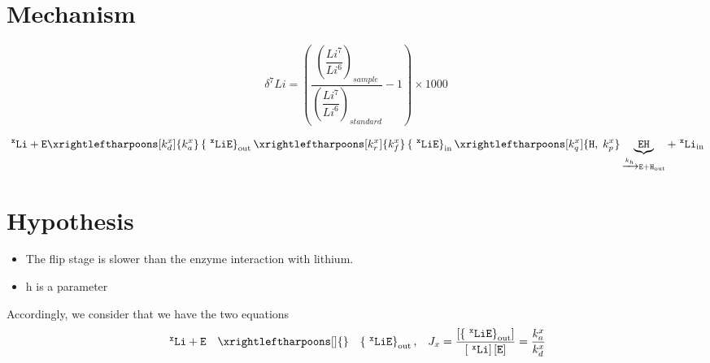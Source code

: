\documentclass[aps,onecolumn,11pt]{revtex4}
\newcommand{\mychem}[1]{\mathtt{#1}}
\newcommand{\myconc}[1]{\left\lbrack{#1}\right\rbrack}
\newcommand{\spLi}[1]{{~^{\mychem{#1}}\mychem{Li}}}
\newcommand{\Li}[1]{\myconc{\spLi{#1}}}
\newcommand{\spEout}{\mychem{E}}
\newcommand{\Eout}{\myconc{\spEout}}
\newcommand{\spLiEin}[1]{\left\lbrace\spLi{#1}\spEout\right\rbrace_{\mathrm{in}}}
\newcommand{\LiEin}[1]{\myconc{\spLiEin{#1}}}
\newcommand{\spLiEout}[1]{\left\lbrace\spLi{#1}\spEout\right\rbrace_{\mathrm{out}}}
\newcommand{\LiEout}[1]{\myconc{\spLiEout{#1}}}
\newcommand{\spLiIn}[1]{{\spLi{#1}}_{\mathrm{in}}}
\newcommand{\LiIn}[1]{\myconc{\spLiIn{#1}}}
\newcommand{\spEHin}{\mychem{EH}}
\newcommand{\EHin}{\myconc{\spEHin}}
\newcommand{\proton}{\mathrm{h}}
\begin{document}
\section{Mechanism}
$$
	\delta^7Li = \left(
		\dfrac{\left(\dfrac{Li^7}{Li^6}\right)_{sample}}
		{\left(\dfrac{Li^7}{Li^6}\right)_{standard}}
		 -1 
	\right) \times 1000
$$


\begin{equation}
	 \spLi{x} +  \spEout  
	 \xrightleftharpoons[k_d^x]{k_a^x} 
	 \spLiEout{x}
	  \xrightleftharpoons[k_r^x]{k_f^x} 
	  \spLiEin{x} 
	  \xrightleftharpoons[k_q^x]{\mychem{H},\;k_p^x} \underbrace{\spEHin}_{\xrightarrow[]{k_h} \mychem{E} + \mychem{H}_{\mathrm{out}}} + \spLiIn{x}
\end{equation}

\section{Hypothesis}
\begin{itemize}
\item The flip stage is slower than the enzyme interaction with lithium.
\item $\proton$ is a parameter
\end{itemize}

Accordingly, we consider that we have the two equations
\begin{equation}
	\begin{array}{rcll}
	 \spLi{x} +  \spEout &  \xrightleftharpoons[]{} & \spLiEout{x}, & J_x = \dfrac{\LiEout{x}}{\Li{x} \Eout} = \dfrac{k_a^x}{k_d^x}\\
	\end{array}
\end{equation}
\end{document}
